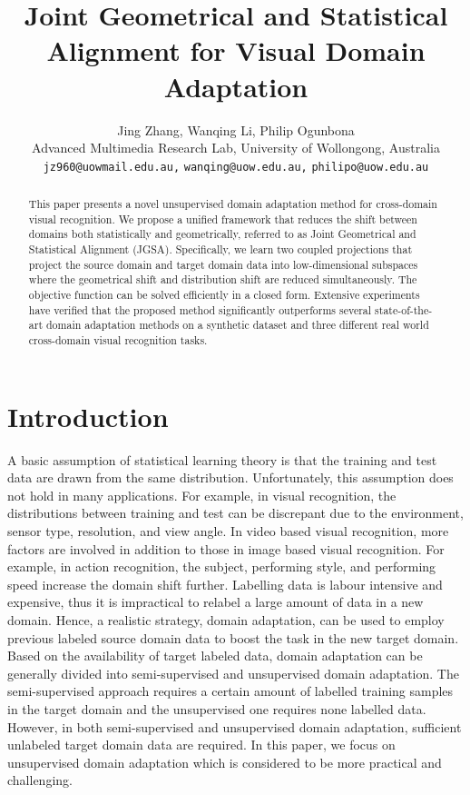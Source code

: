\documentclass[10pt,twocolumn,letterpaper]{article}
\begin{document}
\title{Joint Geometrical and Statistical Alignment for Visual Domain Adaptation}

\author{Jing Zhang, Wanqing Li, Philip Ogunbona\\
Advanced Multimedia Research Lab, University of Wollongong, Australia\\
{\tt\small jz960@uowmail.edu.au,}
{\tt\small wanqing@uow.edu.au,}
{\tt\small philipo@uow.edu.au}\\
}





\maketitle
\begin{abstract}
This paper presents a novel unsupervised domain adaptation method for cross-domain visual recognition. We propose a unified framework that reduces the shift between domains both statistically and geometrically, referred to as Joint Geometrical and Statistical Alignment (JGSA). Specifically, we learn two coupled projections that project the source domain and target domain data into low-dimensional subspaces where the geometrical shift and distribution shift are reduced simultaneously. The objective function can be solved efficiently in a closed form. Extensive experiments have verified that the proposed method significantly outperforms several state-of-the-art domain adaptation methods on a synthetic dataset and three different real world cross-domain visual recognition tasks.

\end{abstract}

\section{Introduction}
A basic assumption of statistical learning theory is that the training and test data are drawn from the same distribution. Unfortunately, this assumption does not hold in many applications. For example, in visual recognition, the distributions between training and test can be discrepant due to the environment, sensor type, resolution, and view angle. In video based visual recognition, more factors are involved in addition to those in image based visual recognition. For example, in action recognition, the subject, performing style, and performing speed increase the domain shift further. Labelling data is labour intensive and expensive, thus it is impractical to relabel a large amount of data in a new domain. Hence, a realistic strategy, domain adaptation, can be used to employ previous labeled source domain data to boost the task in the new target domain. Based on the availability of target labeled data, domain adaptation can be generally divided into semi-supervised and unsupervised domain adaptation. The semi-supervised approach requires a certain amount of labelled training samples in the target domain and the unsupervised one requires none labelled data. 
However, in both semi-supervised and unsupervised domain adaptation, sufficient unlabeled target domain data are required. In this paper, we focus on unsupervised domain adaptation which is considered to be more practical and challenging.
\end{document}
